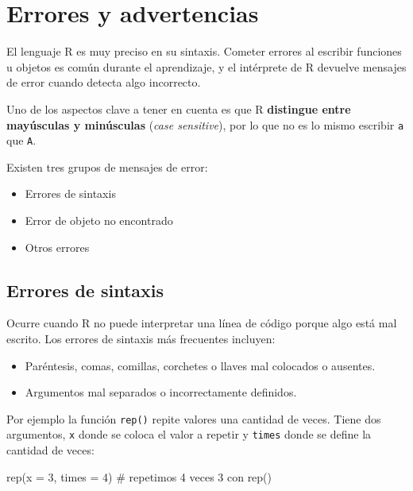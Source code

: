 \documentclass[
  spanish,
  a4paper,
]{scrbook}
\newenvironment{Shaded}{\begin{snugshade}}{\end{snugshade}}
\newcommand{\AttributeTok}[1]{\textcolor[rgb]{0.40,0.45,0.13}{#1}}
\newcommand{\CommentTok}[1]{\textcolor[rgb]{0.37,0.37,0.37}{#1}}
\newcommand{\DecValTok}[1]{\textcolor[rgb]{0.68,0.00,0.00}{#1}}
\newcommand{\FunctionTok}[1]{\textcolor[rgb]{0.28,0.35,0.67}{#1}}
\newcommand{\NormalTok}[1]{\textcolor[rgb]{0.00,0.23,0.31}{#1}}
\begin{document}
\section{Errores y advertencias}\label{errores-y-advertencias}

El lenguaje R es muy preciso en su sintaxis. Cometer errores al escribir
funciones u objetos es común durante el aprendizaje, y el intérprete de
R devuelve mensajes de error cuando detecta algo incorrecto.

Uno de los aspectos clave a tener en cuenta es que R \textbf{distingue
entre mayúsculas y minúsculas} (\emph{case sensitive}), por lo que no es
lo mismo escribir \texttt{a} que \texttt{A}.

Existen tres grupos de mensajes de error:

\begin{itemize}
\item
  Errores de sintaxis
\item
  Error de objeto no encontrado
\item
  Otros errores
\end{itemize}

\subsection{Errores de sintaxis}\label{errores-de-sintaxis}

Ocurre cuando R no puede interpretar una línea de código porque algo
está mal escrito. Los errores de sintaxis más frecuentes incluyen:

\begin{itemize}
\item
  Paréntesis, comas, comillas, corchetes o llaves mal colocados o
  ausentes.
\item
  Argumentos mal separados o incorrectamente definidos.
\end{itemize}

Por ejemplo la función \texttt{rep()} repite valores una cantidad de
veces. Tiene dos argumentos, \texttt{x} donde se coloca el valor a
repetir y \texttt{times} donde se define la cantidad de veces:

\begin{Shaded}
\begin{Highlighting}[]
\FunctionTok{rep}\NormalTok{(}\AttributeTok{x =} \DecValTok{3}\NormalTok{, }\AttributeTok{times =} \DecValTok{4}\NormalTok{) }\CommentTok{\# repetimos 4 veces 3 con rep()}
\end{Highlighting}
\end{Shaded}
\end{document}
